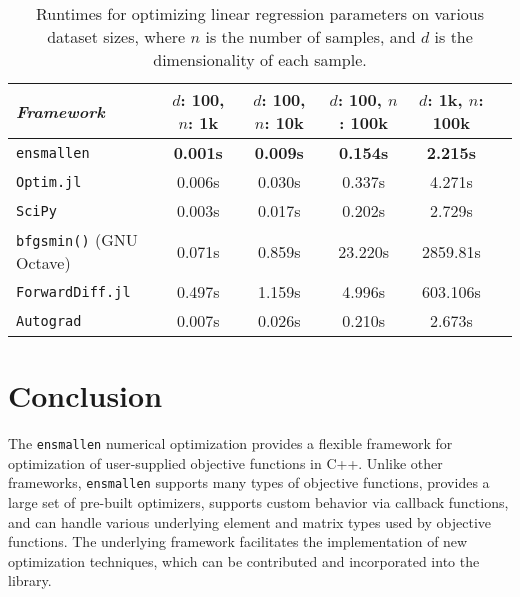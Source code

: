 \documentclass[twoside,11pt]{article}
\begin{document}
\begin{table}[t!]
{\small
\centering
\begin{tabular}{lccccc}
\toprule
{\em Framework} & $d$: 100, $n$: 1k & $d$: 100, $n$: 10k & $d$: 100, $n$:
100k & $d$: 1k, $n$: 100k \\
\midrule
\texttt{ensmallen} & {\bf 0.001s} & {\bf 0.009s} & {\bf 0.154s} & {\bf 2.215s} \\
\texttt{Optim.jl}  & 0.006s & 0.030s & 0.337s & 4.271s \\
\texttt{SciPy} & 0.003s & 0.017s & 0.202s & 2.729s \\
\texttt{bfgsmin()} (GNU Octave) & 0.071s & 0.859s & 23.220s & 2859.81s\\
\texttt{ForwardDiff.jl} & 0.497s & 1.159s & 4.996s & 603.106s \\
\texttt{Autograd} & 0.007s & 0.026s & 0.210s & 2.673s \\
\bottomrule
\end{tabular}
\vspace*{-0.4em}
\caption{
Runtimes for optimizing linear regression parameters on various dataset sizes,
where $n$ is the number of samples,
and $d$ is the dimensionality of each sample.
}
\label{tab:lbfgs}
}
\vspace*{-2.2em}
\end{table}


\section{Conclusion}

The {\tt ensmallen} numerical optimization provides a flexible framework
for optimization of user-supplied objective functions in C++.
Unlike other frameworks, {\tt ensmallen} supports many types of objective functions,
provides a large set of pre-built optimizers,
supports custom behavior via callback functions,
and can handle various underlying element and matrix types used by objective functions.
The underlying framework facilitates the implementation of new optimization techniques,
which can be contributed and incorporated into the library.
\end{document}
